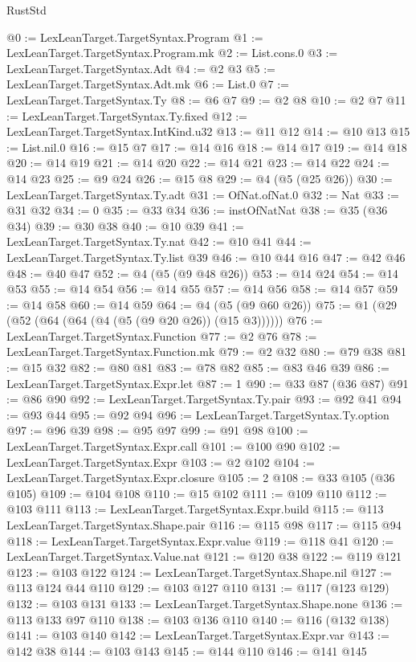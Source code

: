 \begin{lexlean}{RustStd}
\begin{coremodule}
@0 := LexLeanTarget.TargetSyntax.Program
@1 := LexLeanTarget.TargetSyntax.Program.mk
@2 := List.cons.{0}
@3 := LexLeanTarget.TargetSyntax.Adt
@4 := @2 @3
@5 := LexLeanTarget.TargetSyntax.Adt.mk
@6 := List.{0}
@7 := LexLeanTarget.TargetSyntax.Ty
@8 := @6 @7
@9 := @2 @8
@10 := @2 @7
@11 := LexLeanTarget.TargetSyntax.Ty.fixed
@12 := LexLeanTarget.TargetSyntax.IntKind.u32
@13 := @11 @12
@14 := @10 @13
@15 := List.nil.{0}
@16 := @15 @7
@17 := @14 @16
@18 := @14 @17
@19 := @14 @18
@20 := @14 @19
@21 := @14 @20
@22 := @14 @21
@23 := @14 @22
@24 := @14 @23
@25 := @9 @24
@26 := @15 @8
@29 := @4 (@5 (@25 @26))
@30 := LexLeanTarget.TargetSyntax.Ty.adt
@31 := OfNat.ofNat.{0}
@32 := Nat
@33 := @31 @32
@34 := 0
@35 := @33 @34
@36 := instOfNatNat
@38 := @35 (@36 @34)
@39 := @30 @38
@40 := @10 @39
@41 := LexLeanTarget.TargetSyntax.Ty.nat
@42 := @10 @41
@44 := LexLeanTarget.TargetSyntax.Ty.list @39
@46 := @10 @44 @16
@47 := @42 @46
@48 := @40 @47
@52 := @4 (@5 (@9 @48 @26))
@53 := @14 @24
@54 := @14 @53
@55 := @14 @54
@56 := @14 @55
@57 := @14 @56
@58 := @14 @57
@59 := @14 @58
@60 := @14 @59
@64 := @4 (@5 (@9 @60 @26))
@75 := @1 (@29 (@52 (@64 (@64 (@4 (@5 (@9 @20 @26)) (@15 @3))))))
@76 := LexLeanTarget.TargetSyntax.Function
@77 := @2 @76
@78 := LexLeanTarget.TargetSyntax.Function.mk
@79 := @2 @32
@80 := @79 @38
@81 := @15 @32
@82 := @80 @81
@83 := @78 @82
@85 := @83 @46 @39
@86 := LexLeanTarget.TargetSyntax.Expr.let
@87 := 1
@90 := @33 @87 (@36 @87)
@91 := @86 @90
@92 := LexLeanTarget.TargetSyntax.Ty.pair
@93 := @92 @41
@94 := @93 @44
@95 := @92 @94
@96 := LexLeanTarget.TargetSyntax.Ty.option
@97 := @96 @39
@98 := @95 @97
@99 := @91 @98
@100 := LexLeanTarget.TargetSyntax.Expr.call
@101 := @100 @90
@102 := LexLeanTarget.TargetSyntax.Expr
@103 := @2 @102
@104 := LexLeanTarget.TargetSyntax.Expr.closure
@105 := 2
@108 := @33 @105 (@36 @105)
@109 := @104 @108
@110 := @15 @102
@111 := @109 @110
@112 := @103 @111
@113 := LexLeanTarget.TargetSyntax.Expr.build
@115 := @113 LexLeanTarget.TargetSyntax.Shape.pair
@116 := @115 @98
@117 := @115 @94
@118 := LexLeanTarget.TargetSyntax.Expr.value
@119 := @118 @41
@120 := LexLeanTarget.TargetSyntax.Value.nat
@121 := @120 @38
@122 := @119 @121
@123 := @103 @122
@124 := LexLeanTarget.TargetSyntax.Shape.nil
@127 := @113 @124 @44 @110
@129 := @103 @127 @110
@131 := @117 (@123 @129)
@132 := @103 @131
@133 := LexLeanTarget.TargetSyntax.Shape.none
@136 := @113 @133 @97 @110
@138 := @103 @136 @110
@140 := @116 (@132 @138)
@141 := @103 @140
@142 := LexLeanTarget.TargetSyntax.Expr.var
@143 := @142 @38
@144 := @103 @143
@145 := @144 @110
@146 := @141 @145

\end{coremodule}
\end{lexlean}
